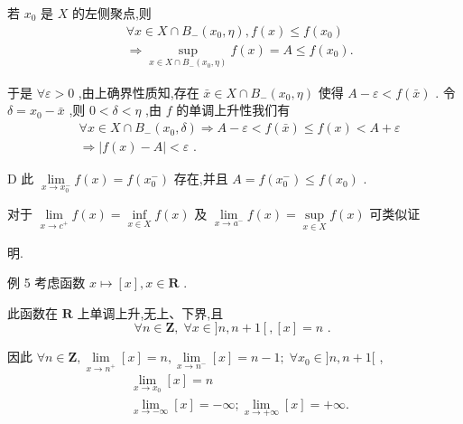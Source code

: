 若 ${x}_{0}$ 是 $X$ 的左侧聚点,则
\begin{align*}
	&\forall x \in  X \cap  {B}_{ - }\left( {{x}_{0},\eta }\right) ,f\left( x\right)  \leq  f\left( {x}_{0}\right)\\
	&\Rightarrow  \mathop{\sup }\limits_{{x \in  X \cap  {B}_{ - }\left( {{x}_{0},\eta }\right) }}f\left( x\right)  = A \leq  f\left( {x}_{0}\right) .
\end{align*}

于是 $\forall \varepsilon  > 0$ ,由上确界性质知,存在 $\bar{x} \in  X \cap  {B}_{ - }\left( {{x}_{0},\eta }\right)$ 使得 $A - \varepsilon  < f\left( \bar{x}\right)$ . 令 $\delta  = {x}_{0} - \bar{x}$ ,则 $0 < \delta  < \eta$ ,由 $f$ 的单调上升性我们有
\begin{align*}
	&\forall x \in  X \cap  {B}_{ - }\left( {{x}_{0},\delta }\right)  \Rightarrow  A - \varepsilon  < f\left( \bar{x}\right)  \leq  f\left( x\right)  < A + \varepsilon\\
	&\Rightarrow  \left| {f\left( x\right)  - A}\right|  < \varepsilon \text{ . }
\end{align*}

D 此 $\mathop{\lim }\limits_{{x \rightarrow  {x}_{0}^{ - }}}f\left( x\right)  = f\left( {x}_{0}^{ - }\right)$ 存在,并且 $A = f\left( {x}_{0}^{ - }\right)  \leq  f\left( {x}_{0}\right)$ .

对于 $\mathop{\lim }\limits_{{x \rightarrow  {c}^{ + }}}f\left( x\right)  = \mathop{\inf }\limits_{{x \in  X}}f\left( x\right)$ 及 $\mathop{\lim }\limits_{{x \rightarrow  {a}^{ - }}}f\left( x\right)  = \mathop{\sup }\limits_{{x \in  X}}f\left( x\right)$ 可类似证

明.

例 5 考虑函数 $x \mapsto  \left\lbrack  x\right\rbrack  ,x \in  \mathbf{R}$ .

此函数在 $\mathbf{R}$ 上单调上升,无上、下界,且
$$\forall n \in  \mathbf{Z},\;\forall x \in  \rbrack n,n + 1\left\lbrack  {,\left\lbrack  x\right\rbrack   = n}\right. \text{ . }$$

因此 $\forall n \in  \mathbf{Z},\mathop{\lim }\limits_{{x \rightarrow  {n}^{ + }}}\left\lbrack  x\right\rbrack   = n,\mathop{\lim }\limits_{{x \rightarrow  {n}^{ - }}}\left\lbrack  x\right\rbrack   = n - 1;\;\forall {x}_{0} \in  \rbrack n,n + 1\lbrack$ ,
\begin{align*}
	&\mathop{\lim }\limits_{{x \rightarrow  {x}_{0}}}\left\lbrack  x\right\rbrack   = n\\
	&\mathop{\lim }\limits_{{x \rightarrow   - \infty }}\left\lbrack  x\right\rbrack   =  - \infty ;\mathop{\lim }\limits_{{x \rightarrow   + \infty }}\left\lbrack  x\right\rbrack   =  + \infty .
\end{align*}

